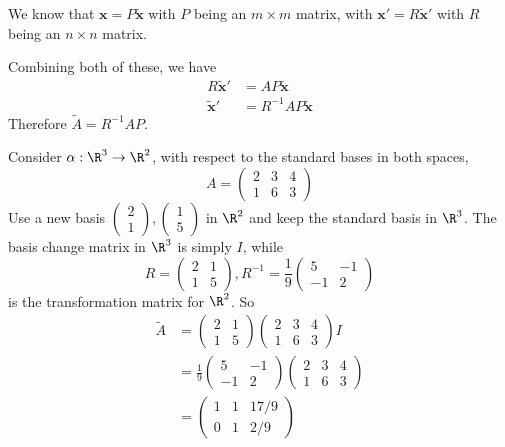 \documentclass[a4paper]{article}
\begin{document}
      We know that $\mathbf{x} = P\mathbf{\tilde{x}}$ with $P$ being an $m\times m$ matrix, with $\mathbf{x}' = R\tilde{\mathbf{x}}'$ with $R$ being an $n\times n$ matrix.

      Combining both of these, we have
      \begin{align*}
        R\tilde{\mathbf{x}}' &= AP\tilde{\mathbf{x}}\\
        \tilde{\mathbf{x}}' &= R^{-1}AP\mathbf{\tilde{x}}
      \end{align*}
      Therefore $\tilde{A} = R^{-1}AP$.

      \begin{eg}
        Consider $\alpha: \R^3 \to \R^2$, with respect to the standard bases in both spaces,
        \[
          A = 
          \begin{pmatrix}
            2 & 3 & 4\\
            1 & 6 & 3
          \end{pmatrix}
        \]
        Use a new basis $
        \begin{pmatrix}
          2\\1
        \end{pmatrix}, 
        \begin{pmatrix}
          1\\5
        \end{pmatrix}$ in $\R^2$ and keep the standard basis in $\R^3$. The basis change matrix in $\R^3$ is simply $I$, while
        \[
          R = 
          \begin{pmatrix}
            2& 1\\
            1 & 5
          \end{pmatrix}, R^{-1} = \frac{1}{9}
          \begin{pmatrix}
            5 & -1\\
            -1 & 2
          \end{pmatrix}
        \]
        is the transformation matrix for $\R^2$. So
        \begin{align*}
          \tilde{A} &= 
          \begin{pmatrix}
            2 & 1\\1 & 5
          \end{pmatrix}
          \begin{pmatrix}
            2 & 3 & 4\\1 & 6 & 3
          \end{pmatrix}I\\
          &= \frac{1}{9}
          \begin{pmatrix}
            5 & -1\\
            -1 & 2
          \end{pmatrix}
          \begin{pmatrix}
            2 & 3 & 4\\1 & 6 & 3
          \end{pmatrix}\\
          &= 
          \begin{pmatrix}
            1 & 1 & 17/9\\
            0 & 1 & 2/9
          \end{pmatrix}
        \end{align*}


\end{eg}
\end{document}
